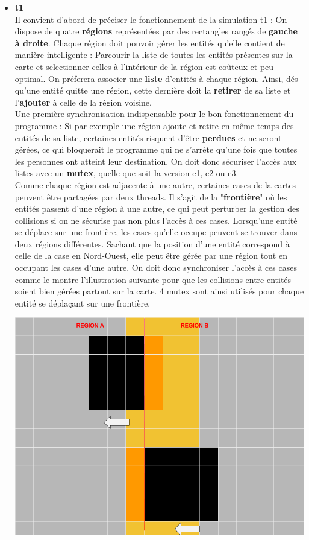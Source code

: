 \documentclass[11pt]{article} %
\begin{document}
\begin{itemize}
	\item \textbf {t1} \\
	Il convient d'abord de préciser le fonctionnement de la simulation t1 : On dispose de quatre \textbf{régions} représentées par des rectangles rangés de \textbf{gauche à droite}. Chaque région doit pouvoir gérer les entités qu'elle contient de manière intelligente : Parcourir la liste de toutes les entités présentes sur la carte et selectionner celles à l'intérieur de la région est coûteux et peu optimal. On préferera  associer une \textbf{liste} d'entités à chaque région. Ainsi, dés qu'une entité quitte une région, cette dernière doit la \textbf{retirer} de sa liste et l'\textbf{ajouter} à celle de la région voisine. \\

Une première synchronisation indispensable pour le bon fonctionnement du programme : Si par exemple une région ajoute et retire en même temps des entités de sa liste, certaines entités risquent d'être \textbf{perdues} et ne seront gérées, ce qui bloquerait le programme qui ne s'arrête qu'une fois que toutes les personnes ont atteint leur destination. On doit donc sécuriser l'accès aux listes avec un \textbf{mutex}, quelle que soit la version e1, e2 ou e3. \\

Comme chaque région est adjacente à une autre, certaines cases de la cartes peuvent être partagées par deux threads. Il s'agit de la "\textbf{frontière}" où les entités passent d'une région à une autre, ce qui peut perturber la gestion des collisions si on ne sécurise pas non plus l'accès à ces cases.
Lorsqu'une entité se déplace sur une frontière, les cases qu'elle occupe peuvent se trouver dans deux régions différentes. Sachant que la position d'une entité correspond à celle de la case en Nord-Ouest, elle peut être gérée par une région tout en occupant les cases d'une autre. On doit donc synchroniser l'accès à ces cases comme le montre l'illustration suivante pour que les collisions entre entités soient bien gérées partout sur la carte. 4 mutex sont ainsi utilisés pour chaque entité se déplaçant sur une frontière.

\includegraphics[scale=0.3]{synct1}





\end{itemize}
\end{document}
